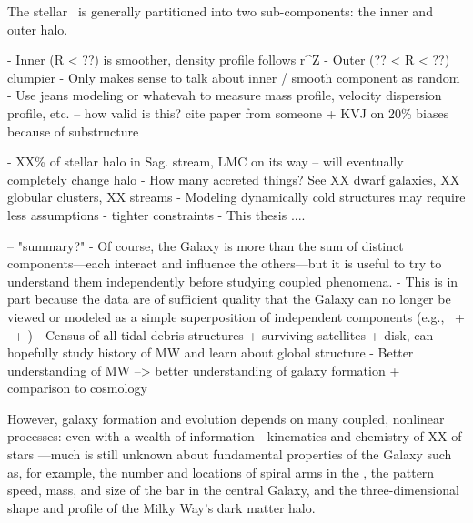 The stellar \mwhalo\ is generally partitioned into two sub-components: the inner and outer halo. 

- Inner (R < ??) is smoother, density profile follows r^Z
- Outer (?? < R < ??) clumpier
- Only makes sense to talk about inner / smooth component as random
- Use jeans modeling or whatevah to measure mass profile, velocity dispersion profile, etc. -- how valid is this? cite paper from someone + KVJ on 20\% biases because of substructure

- XX\% of stellar halo in Sag. stream, LMC on its way -- will eventually completely change halo
- How many accreted things? See XX dwarf galaxies, XX globular clusters, XX streams
- Modeling dynamically cold structures may require less assumptions - tighter constraints
- This thesis ....

-- "summary?"
- Of course, the Galaxy is more than the sum of distinct components---each interact and influence the others---but it is useful to try to understand them independently before studying coupled phenomena. 
- This is in part because the data are of sufficient quality that the Galaxy can no longer be viewed or modeled as a simple superposition of independent components (e.g., \mwdisk\ + \mwbulge\ + \mwhalo)
- Census of all tidal debris structures + surviving satellites + disk, can hopefully study history of MW and learn about global structure
- Better understanding of MW --> better understanding of galaxy formation + comparison to cosmology


However, galaxy formation and evolution depends on many coupled, nonlinear processes: even with a wealth of information---kinematics and chemistry of XX of stars \citep{todo}---much is still unknown about fundamental properties of the Galaxy such as, for example, the number and locations of spiral arms in the \mwdisk, the pattern speed, mass, and size of the bar in the central Galaxy, and the three-dimensional shape and profile of the Milky Way's dark matter halo. 


